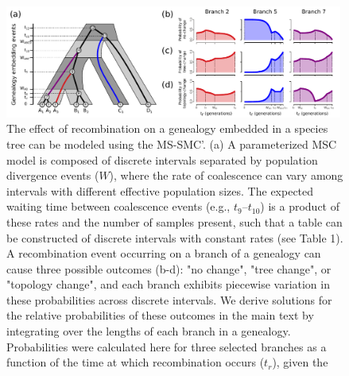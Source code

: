 \documentclass[11pt]{article}
\begin{document}
\begin{figure}
	\centering
	\includegraphics[width=0.99\textwidth]{figures/Fig1-embedding-and-probs-fill.pdf}
	\caption{
		The effect of recombination on a genealogy embedded in a species tree
		can be modeled using the MS-SMC'. 
		(a) A parameterized MSC model is composed of discrete intervals separated 
		by population divergence events ($W$), where the rate of coalescence can vary
		among intervals with different effective population sizes. The expected waiting
		time between coalescence events (e.g., $t_9$--$t_{10}$) is a product of these
		rates and the number of samples present, such that a table can be constructed of
		discrete intervals with constant rates (see Table 1). 
		A recombination event occurring on a branch of a genealogy can cause
		three possible outcomes (b-d): "no change", "tree change", or "topology 
		change", and each branch exhibits piecewise variation in these 
		probabilities across discrete intervals. We derive solutions for 
		the relative probabilities of these outcomes in the main text by 
		integrating over the lengths of each branch in a genealogy. 
		Probabilities were calculated here for three selected branches as a 
		function of the time at which recombination occurs ($t_r$), given the 
}
\end{figure}
\end{document}
